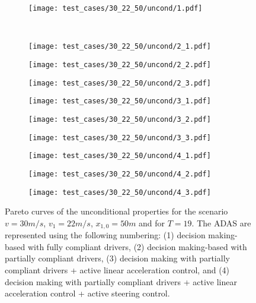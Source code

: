 \begin{figure}[H]
\centering
\begin{subfigure}{0.32\textwidth}
  \centering
  \texttt{[image: test\_cases/30\_22\_50/uncond/1.pdf]}
\end{subfigure}\\
\begin{subfigure}{0.32\textwidth}
  \centering
  \texttt{[image: test\_cases/30\_22\_50/uncond/2\_1.pdf]}
\end{subfigure} 
\begin{subfigure}{0.32\textwidth}
  \centering
  \texttt{[image: test\_cases/30\_22\_50/uncond/2\_2.pdf]}
\end{subfigure}
\begin{subfigure}{0.32\textwidth}
  \centering
  \texttt{[image: test\_cases/30\_22\_50/uncond/2\_3.pdf]}
\end{subfigure}
\begin{subfigure}{0.32\textwidth}
  \centering
  \texttt{[image: test\_cases/30\_22\_50/uncond/3\_1.pdf]}
\end{subfigure}
\begin{subfigure}{0.32\textwidth}
  \centering
  \texttt{[image: test\_cases/30\_22\_50/uncond/3\_2.pdf]}
\end{subfigure}
\begin{subfigure}{0.32\textwidth}
  \centering
  \texttt{[image: test\_cases/30\_22\_50/uncond/3\_3.pdf]}
\end{subfigure}
\begin{subfigure}{0.32\textwidth}
  \centering
  \texttt{[image: test\_cases/30\_22\_50/uncond/4\_1.pdf]}
\end{subfigure} 
\begin{subfigure}{0.32\textwidth}
  \centering
  \texttt{[image: test\_cases/30\_22\_50/uncond/4\_2.pdf]}
\end{subfigure}
\begin{subfigure}{0.32\textwidth}
  \centering
  \texttt{[image: test\_cases/30\_22\_50/uncond/4\_3.pdf]}
\end{subfigure}
\caption{Pareto curves of the unconditional properties for the scenario $v = 30m/s$, $v_1 = 22m/s$, $x_{1,0} = 50m$ and for $T = 19$. The ADAS are represented using the following numbering: (1) decision making-based with fully compliant drivers, (2) decision making-based with partially compliant drivers, (3) decision making with partially compliant drivers + active linear acceleration control, and (4) decision making with partially compliant drivers + active linear acceleration control + active steering control.}
\label{fig:test_case_2_uncond}
\end{figure}

